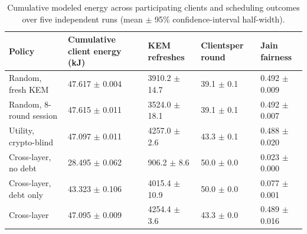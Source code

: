 \begin{table}[!ht]
\caption{Cumulative modeled energy across participating clients and scheduling outcomes over five independent runs (mean $\pm$ 95\% confidence-interval half-width).}
\label{tab:cost}
\centering
\setlength{\tabcolsep}{2pt}
\begin{tabular}{|p{}|p{}|p{}|p{}|p{}|}
\hline
Policy & Cumulative client energy (kJ) & KEM refreshes & Clients\newline{}per round & Jain fairness \\
\hline
Random, fresh KEM & 47.617 $\pm$ 0.004 & 3910.2 $\pm$ 14.7 & 39.1 $\pm$ 0.1 & 0.492 $\pm$ 0.009 \\
\hline
Random, 8-round session & 47.615 $\pm$ 0.011 & 3524.0 $\pm$ 18.1 & 39.1 $\pm$ 0.1 & 0.492 $\pm$ 0.007 \\
\hline
Utility, crypto-blind & 47.097 $\pm$ 0.011 & 4257.0 $\pm$ 2.6 & 43.3 $\pm$ 0.1 & 0.488 $\pm$ 0.020 \\
\hline
Cross-layer, no debt & 28.495 $\pm$ 0.062 & 906.2 $\pm$ 8.6 & 50.0 $\pm$ 0.0 & 0.023 $\pm$ 0.000 \\
\hline
Cross-layer, debt only & 43.323 $\pm$ 0.106 & 4015.4 $\pm$ 10.9 & 50.0 $\pm$ 0.0 & 0.077 $\pm$ 0.001 \\
\hline
Cross-layer & 47.095 $\pm$ 0.009 & 4254.4 $\pm$ 3.6 & 43.3 $\pm$ 0.0 & 0.489 $\pm$ 0.016 \\
\hline
\end{tabular}
\end{table}

